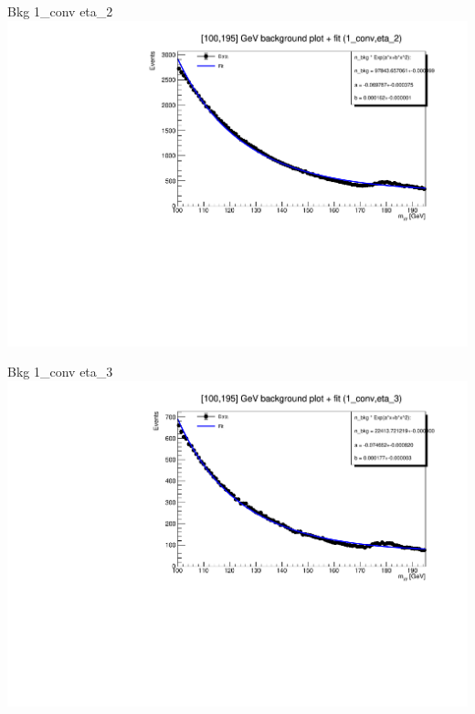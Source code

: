 \documentclass[10pt,UKenglish, leqno, xcolor = dvipsnames]{beamer}
\begin{document}
		\begin{frame}{Bkg 1\_conv eta\_2}
			\vfill
			\includegraphics[width=1.\textwidth]{../images/week_9/bkg_100_195GeV_fit_1_conv_eta_2.pdf}
			\vfill
		\end{frame}
		
		\begin{frame}{Bkg 1\_conv eta\_3}
			\vfill
			\includegraphics[width=1.\textwidth]{../images/week_9/bkg_100_195GeV_fit_1_conv_eta_3.pdf}
			\vfill
		\end{frame}
	
\end{document}
